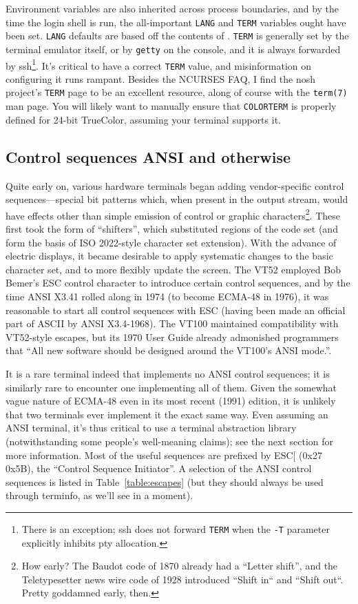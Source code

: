 Environment variables are also inherited across process boundaries, and by the
time the login shell is run, the all-important \texttt{LANG} and \texttt{TERM}
variables ought have been set. \texttt{LANG} defaults are based off the contents
of . \texttt{TERM} is generally set by the terminal emulator itself,
or by \texttt{getty} on the console, and it is always forwarded by ssh\footnote{There is an exception; ssh does not forward \texttt{TERM} when the \texttt{-T}
parameter explicitly inhibits pty allocation.}. It's critical to have a correct \texttt{TERM}
value, and misinformation on configuring it runs rampant. Besides the NCURSES FAQ\cite{ncursesfaq},
I find the nosh project's \texttt{TERM} page\cite{noshterm} to be an excellent
resource, along of course with the \texttt{term(7)} man page\cite{term7}. You
will likely want to manually ensure that \texttt{COLORTERM} is properly defined
for 24-bit TrueColor, assuming your terminal supports it.

\subsection{Control sequences ANSI and otherwise}
\label{sec:escapes}
Quite early on, various hardware terminals began adding vendor-specific control
sequences---special bit patterns which, when present in the output stream,
would have effects other than simple emission of control or graphic
characters\footnote{How early? The Baudot code of 1870 already had a ``Letter
shift'', and the Teletypesetter news wire code of 1928 introduced ``Shift
in`` and ``Shift out``. Pretty goddamned early, then.}. These first took the
form of ``shifters'', which substituted regions of the code set (and form the
basis of ISO 2022-style character set extension). With the advance of electric
displays, it became desirable to apply systematic changes to the basic
character set, and to more flexibly update the screen. The VT52 employed Bob
Bemer's ESC control character\cite{bemeresc} to introduce certain control
sequences, and by the time ANSI X3.41 rolled along in 1974 (to become ECMA-48 in
1976), it was reasonable to start all control sequences with ESC (having been
made an official part of ASCII by ANSI X3.4-1968). The VT100 maintained
compatibility with VT52-style escapes, but its 1970 User Guide already
admonished programmers that ``All new software should be designed around the
VT100's ANSI mode.''\cite{vt100}.

It is a rare terminal indeed that implements no ANSI control sequences; it is
similarly rare to encounter one implementing all of them. Given the somewhat
vague nature of ECMA-48 even in its most recent (1991) edition\cite{ecma48}, it is unlikely
that two terminals ever implement it the exact same way. Even assuming an ANSI
terminal, it's thus critical to use a terminal abstraction library (notwithstanding
some people's well-meaning claims\cite{lexihale}); see the next section for
more information. Most of the useful sequences are prefixed by ESC[ (0x27 0x5B),
the ``Control Sequence Initiator''. A selection of the ANSI control sequences
is listed in Table~\ref{table:escapes} (but they should always be used through
terminfo, as we'll see in a moment).

